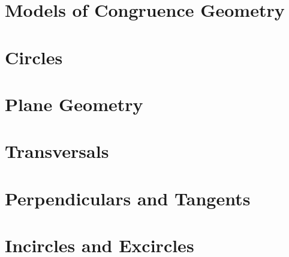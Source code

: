 \documentclass{memoir}
\begin{document}
  \section{Models of Congruence Geometry}
    
    \newpage

  \section{Circles}
    
    \newpage

  \section{Plane Geometry}
    
    \newpage

  \section{Transversals}
    
    \newpage

  \section{Perpendiculars and Tangents}
    
    \newpage

  \section{Incircles and Excircles}
    

\backmatter
  \printindex
\end{document}
